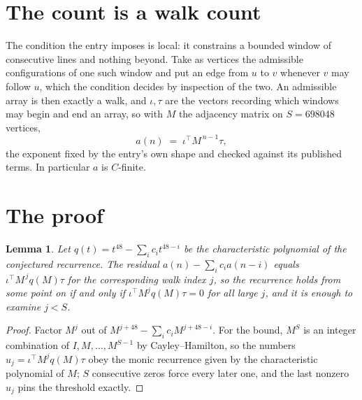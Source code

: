 \documentclass[11pt,a4paper]{article}
\theoremstyle{plain}
\newtheorem{lemma}[theorem]{Lemma}
\theoremstyle{definition}
\begin{document}
\section{The count is a walk count}

The condition the entry imposes is local: it constrains a bounded window of consecutive lines and nothing beyond. Take as vertices the admissible configurations of one such window and put an edge from $u$ to $v$ whenever $v$ may follow $u$, which the condition decides by inspection of the two.
An admissible array is then exactly a walk, and $\iota,\tau$ are the vectors recording which windows may begin and end an array, so with $M$ the adjacency matrix on $S=698048$ vertices,
\[
a(n)\;=\;\iota^{\!\top}M^{\,n-1}\tau ,
\]
the exponent fixed by the entry's own shape and checked against its published terms. In
particular $a$ is $C$-finite.

\section{The proof}

\begin{lemma}\label{lem:crit}
Let $q(t)=t^{48}-\sum_i c_it^{48-i}$ be the characteristic polynomial of the
conjectured recurrence. The residual $a(n)-\sum_ic_ia(n-i)$ equals
$\iota^{\!\top}M^{\,j}q(M)\tau$ for the corresponding walk index $j$, so the recurrence
holds from some point on if and only if $\iota^{\!\top}M^{j}q(M)\tau=0$ for all large $j$,
and it is enough to examine $j<S$.
\end{lemma}

\begin{proof}
Factor $M^{j}$ out of $M^{j+48}-\sum_ic_iM^{j+48-i}$. For the bound, $M^{S}$
is an integer combination of $I,M,\dots,M^{S-1}$ by Cayley--Hamilton, so the numbers
$u_j=\iota^{\!\top}M^{j}q(M)\tau$ obey the monic recurrence given by the characteristic
polynomial of $M$; $S$ consecutive zeros force every later one, and the last nonzero $u_j$
pins the threshold exactly.
\end{proof}
\end{document}
